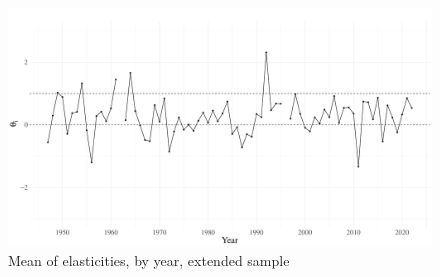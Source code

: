 \documentclass[11pt]{article}
\begin{document}
\begin{figure}[!h]
\centering
\includegraphics[width=.75\textwidth]{../figures/elasticity_est/elasticity_byYear_hist.pdf}
\caption{Mean of elasticities, by year, extended sample}
\label{fig:theta_byYear_hist}
\end{figure}

\clearpage

 
\end{document}
